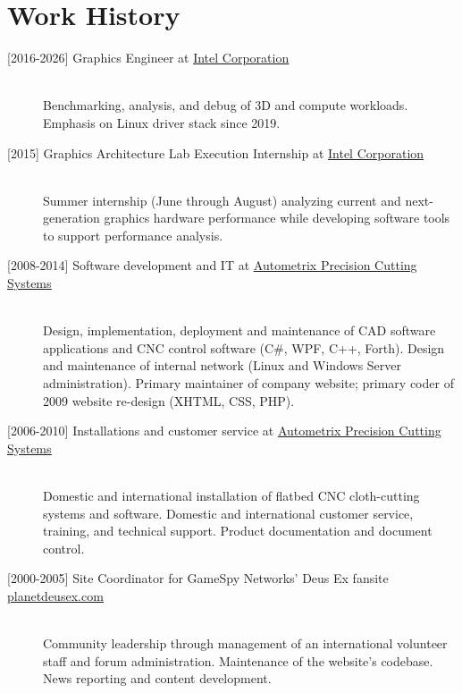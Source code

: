 \documentclass{article}
\begin{document}
	\section*{Work History}
	\begin{description}
		\item[{[}2016-2026{]} Graphics Engineer at \href{http://www.intel.com/}{\uline{Intel Corporation}}] \hfill \\
		Benchmarking, analysis, and debug of 3D and compute workloads. Emphasis on Linux driver stack since 2019.
		\item[{[}2015{]} Graphics Architecture Lab Execution Internship at \href{http://www.intel.com/}{\uline{Intel Corporation}}] \hfill \\
		Summer internship (June through August) analyzing current and next-generation graphics hardware performance while developing software tools to support performance analysis.
		\item[{[}2008-2014{]} Software development and IT at \href{http://www.autometrix.com/}{\uline{Autometrix Precision Cutting Systems}}] \hfill \\
		Design, implementation, deployment and maintenance of CAD software applications and CNC control software (C\#, WPF, C++, Forth). Design and maintenance of internal network (Linux and Windows Server administration). Primary maintainer of company website; primary coder of 2009 website re-design (XHTML, CSS, PHP).
		\item[{[}2006-2010{]} Installations and customer service at \href{http://www.autometrix.com/}{\uline{Autometrix Precision Cutting Systems}}] \hfill \\
		Domestic and international installation of flatbed CNC cloth-cutting systems and software. Domestic and international customer service, training, and technical support. Product documentation and document control.
		\item[{[}2000-2005{]} Site Coordinator for GameSpy Networks' Deus Ex fansite \href{http://planetdeusex.com}{\uline{planetdeusex.com}}] \hfill \\
		Community leadership through management of an international volunteer staff and forum administration. Maintenance of the website's codebase. News reporting and content development.
	\end{description}
\end{document}
